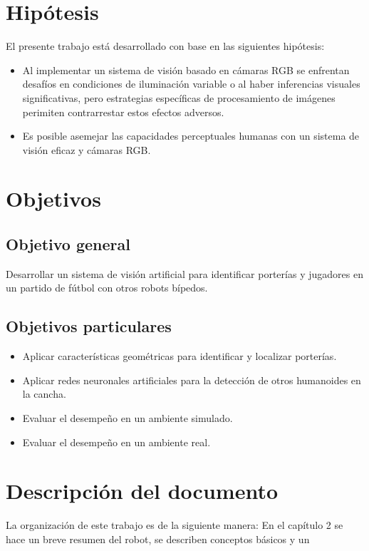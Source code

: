 \section{Hipótesis}
El presente trabajo está desarrollado con base en las siguientes hipótesis:
\begin{itemize}
	\item Al implementar un sistema de visión basado en cámaras RGB se enfrentan desafíos en condiciones de iluminación variable o al haber inferencias visuales significativas, pero estrategias específicas de procesamiento de imágenes perimiten contrarrestar estos efectos adversos.
	\item Es posible asemejar las capacidades perceptuales humanas con un sistema de visión eficaz y cámaras RGB.
\end{itemize}

\section{Objetivos}

\subsection*{Objetivo general}
Desarrollar un sistema de visión artificial para identificar porterías y jugadores en un partido de fútbol con otros robots bípedos.
\subsection*{Objetivos particulares}
\begin{itemize}
    \item Aplicar características geométricas para identificar y localizar porterías.
    \item Aplicar redes neuronales artificiales para la detección de otros humanoides en la cancha.
    \item Evaluar el desempeño en un ambiente simulado.
    \item Evaluar el desempeño en un ambiente real.
\end{itemize}
\section{Descripción del documento}
La organización de este trabajo es de la siguiente manera: En el capítulo 2 se hace un breve resumen del robot, se  describen conceptos básicos y un
